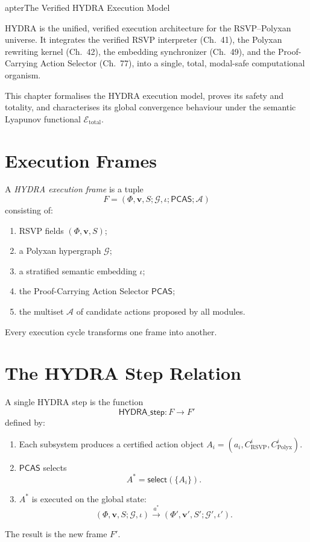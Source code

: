 apter{The Verified HYDRA Execution Model}
\label{ch:78}

HYDRA is the unified, verified execution architecture for the RSVP--Polyxan
universe.  
It integrates the verified RSVP interpreter (Ch.~41),
the Polyxan rewriting kernel (Ch.~42),
the embedding synchronizer (Ch.~49),
and the Proof-Carrying Action Selector (Ch.~77),
into a single, total, modal-safe computational organism.

This chapter formalises the HYDRA execution model, proves its safety and
totality, and characterises its global convergence behaviour under the
semantic Lyapunov functional $\mathcal{E}_{\mathrm{total}}$.

\section{Execution Frames}

\begin{definition}
A \emph{HYDRA execution frame} is a tuple
\[
F = (\Phi,\mathbf{v},S;\mathcal{G},\iota; \mathsf{PCAS}; \mathcal{A})
\]
consisting of:
\begin{enumerate}
\item RSVP fields $(\Phi,\mathbf{v},S)$;
\item a Polyxan hypergraph $\mathcal{G}$;
\item a stratified semantic embedding $\iota$;
\item the Proof-Carrying Action Selector $\mathsf{PCAS}$;
\item the multiset $\mathcal{A}$ of candidate actions proposed by all modules.
\end{enumerate}
\end{definition}

Every execution cycle transforms one frame into another.

\section{The HYDRA Step Relation}

\begin{definition}
A single HYDRA step is the function
\[
\mathsf{HYDRA\_step} : F \to F'
\]
defined by:
\begin{enumerate}
\item Each subsystem produces a certified action object  
      $A_i = (a_i, C^i_{\mathrm{RSVP}}, C^i_{\mathrm{Polyx}})$.
\item $\mathsf{PCAS}$ selects  
      \[
      A^\ast = \mathsf{select}(\{A_i\}).
      \]
\item $A^\ast$ is executed on the global state:
      \[
      (\Phi,\mathbf{v},S;\mathcal{G},\iota)
      \xrightarrow{a^\ast}
      (\Phi',\mathbf{v}',S';\mathcal{G}',\iota').
      \]
\end{enumerate}
The result is the new frame $F'$.
\end{definition}

